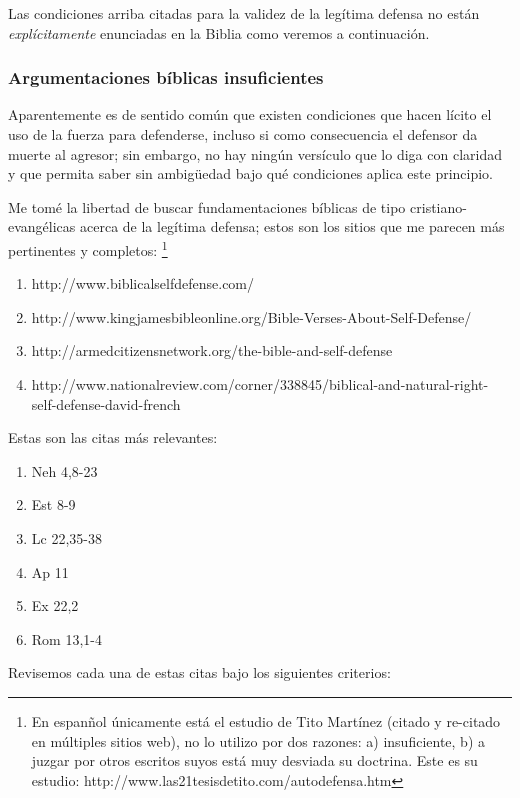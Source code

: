 \documentclass{article}
\begin{document}
\noindent
Las condiciones arriba citadas para la validez de la leg\'{i}tima defensa no est\'an \emph{expl\'{i}citamente} enunciadas en la Biblia como veremos a continuaci\'on.

\subsubsection{Argumentaciones b\'{i}blicas insuficientes}

Aparentemente es de sentido com\'un que existen condiciones que hacen l\'{i}cito el uso de la fuerza para defenderse, incluso si como consecuencia el defensor da muerte al agresor; sin embargo, no hay ning\'un vers\'{i}culo que lo diga con claridad y que permita saber sin ambig\"uedad bajo qu\'e condiciones aplica este principio.

Me tom\'e la libertad de buscar fundamentaciones b\'{i}blicas de tipo cristiano-evang\'elicas acerca de la leg\'{i}tima defensa; estos son los sitios que me parecen m\'as pertinentes y completos:%
    \footnote{En espan\~nol \'unicamente est\'a el estudio de Tito Mart\'{i}nez (citado y re-citado en m\'ultiples sitios web), no lo utilizo por dos razones: a) insuficiente, b) a juzgar por otros escritos suyos est\'a muy desviada su doctrina. Este es su estudio: http://www.las21tesisdetito.com/autodefensa.htm}

\begin{enumerate}
\item http://www.biblicalselfdefense.com/
\item http://www.kingjamesbibleonline.org/Bible-Verses-About-Self-Defense/
\item http://armedcitizensnetwork.org/the-bible-and-self-defense
\item http://www.nationalreview.com/corner/338845/biblical-and-natural-right-self-defense-david-french
\end{enumerate}

\noindent
Estas son las citas m\'as relevantes:

\begin{enumerate}
\item Neh 4,8-23
\item Est 8-9
\item Lc 22,35-38
\item Ap 11
\item Ex 22,2
\item Rom 13,1-4
\end{enumerate}

\noindent
Revisemos cada una de estas citas bajo los siguientes criterios:
\end{document}
